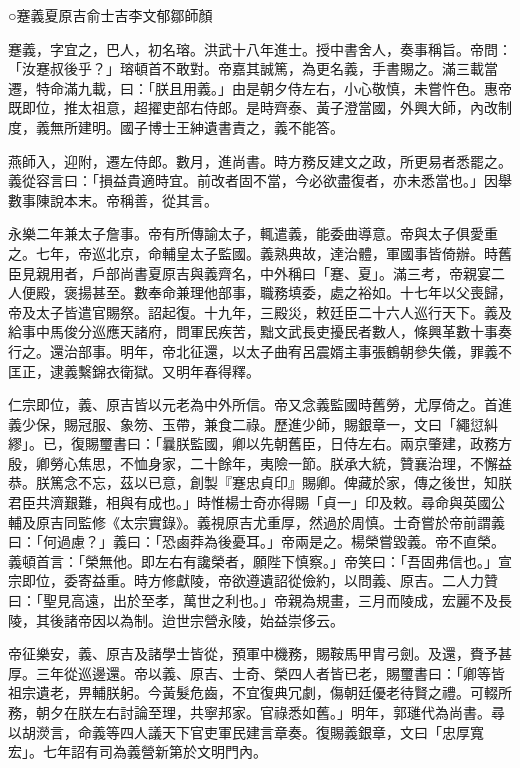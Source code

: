 
\begin{pinyinscope}
○蹇義夏原吉俞士吉李文郁鄒師顏

蹇義，字宜之，巴人，初名瑢。洪武十八年進士。授中書舍人，奏事稱旨。帝問：「汝蹇叔後乎？」瑢頓首不敢對。帝嘉其誠篤，為更名義，手書賜之。滿三載當遷，特命滿九載，曰：「朕且用義。」由是朝夕侍左右，小心敬慎，未嘗忤色。惠帝既即位，推太祖意，超擢吏部右侍郎。是時齊泰、黃子澄當國，外興大師，內改制度，義無所建明。國子博士王紳遺書責之，義不能答。

燕師入，迎附，遷左侍郎。數月，進尚書。時方務反建文之政，所更易者悉罷之。義從容言曰：「損益貴適時宜。前改者固不當，今必欲盡復者，亦未悉當也。」因舉數事陳說本末。帝稱善，從其言。

永樂二年兼太子詹事。帝有所傳諭太子，輒遣義，能委曲導意。帝與太子俱愛重之。七年，帝巡北京，命輔皇太子監國。義熟典故，達治體，軍國事皆倚辦。時舊臣見親用者，戶部尚書夏原吉與義齊名，中外稱曰「蹇、夏」。滿三考，帝親宴二人便殿，褒揚甚至。數奉命兼理他部事，職務填委，處之裕如。十七年以父喪歸，帝及太子皆遣官賜祭。詔起復。十九年，三殿災，敕廷臣二十六人巡行天下。義及給事中馬俊分巡應天諸府，問軍民疾苦，黜文武長吏擾民者數人，條興革數十事奏行之。還治部事。明年，帝北征還，以太子曲宥呂震婿主事張鶴朝參失儀，罪義不匡正，逮義繫錦衣衛獄。又明年春得釋。

仁宗即位，義、原吉皆以元老為中外所信。帝又念義監國時舊勞，尤厚倚之。首進義少保，賜冠服、象笏、玉帶，兼食二祿。歷進少師，賜銀章一，文曰「繩愆糾繆」。已，復賜璽書曰：「曩朕監國，卿以先朝舊臣，日侍左右。兩京肇建，政務方殷，卿勞心焦思，不恤身家，二十餘年，夷險一節。朕承大統，贊襄治理，不懈益恭。朕篤念不忘，茲以已意，創製『蹇忠貞印』賜卿。俾藏於家，傳之後世，知朕君臣共濟艱難，相與有成也。」時惟楊士奇亦得賜「貞一」印及敕。尋命與英國公輔及原吉同監修《太宗實錄》。義視原吉尤重厚，然過於周慎。士奇嘗於帝前謂義曰：「何過慮？」義曰：「恐鹵莽為後憂耳。」帝兩是之。楊榮嘗毀義。帝不直榮。義頓首言：「榮無他。即左右有讒榮者，願陛下慎察。」帝笑曰：「吾固弗信也。」宣宗即位，委寄益重。時方修獻陵，帝欲遵遺詔從儉約，以問義、原吉。二人力贊曰：「聖見高遠，出於至孝，萬世之利也。」帝親為規畫，三月而陵成，宏麗不及長陵，其後諸帝因以為制。迨世宗營永陵，始益崇侈云。

帝征樂安，義、原吉及諸學士皆從，預軍中機務，賜鞍馬甲胄弓劍。及還，賚予甚厚。三年從巡邊還。帝以義、原吉、士奇、榮四人者皆已老，賜璽書曰：「卿等皆祖宗遺老，畀輔朕躬。今黃髮危齒，不宜復典冗劇，傷朝廷優老待賢之禮。可輟所務，朝夕在朕左右討論至理，共寧邦家。官祿悉如舊。」明年，郭璡代為尚書。尋以胡濙言，命義等四人議天下官吏軍民建言章奏。復賜義銀章，文曰「忠厚寬宏」。七年詔有司為義營新第於文明門內。


\end{pinyinscope}
